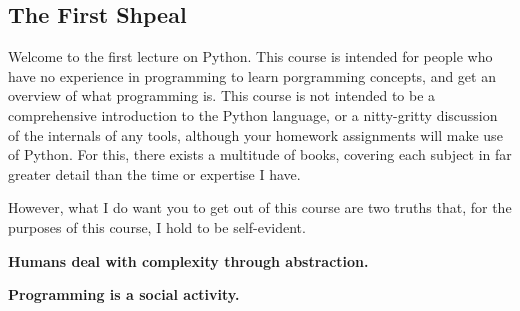\subsection{The First Shpeal}

Welcome to the first lecture on Python. This course is intended for people who
have no experience in programming to learn porgramming concepts, and get an
overview of what programming is. This course is not intended to be a 
comprehensive introduction to the Python language, or a nitty-gritty
discussion of the internals of any tools, although your homework assignments
will make use of Python. For this, there exists a multitude of books, covering
each subject in far greater detail than the time or expertise I have.

However, what I do want you to get out of this course are two truths that, for
the purposes of this course, I hold to be self-evident.

\textbf{Humans deal with complexity through abstraction.} 

\textbf{Programming is a social activity.} 

